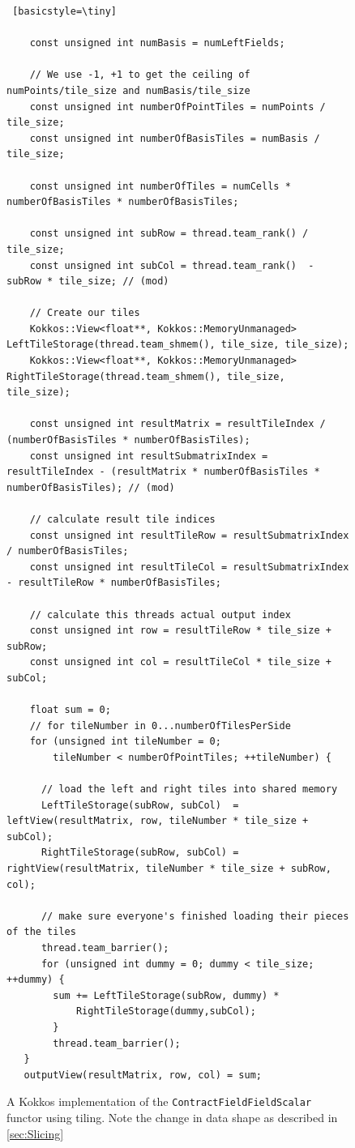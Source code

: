 \begin{figure}[H]
    \begin{lstlisting} [basicstyle=\tiny]
    
    const unsigned int numBasis = numLeftFields;

    // We use -1, +1 to get the ceiling of numPoints/tile_size and numBasis/tile_size
    const unsigned int numberOfPointTiles = numPoints / tile_size;
    const unsigned int numberOfBasisTiles = numBasis / tile_size;

    const unsigned int numberOfTiles = numCells * numberOfBasisTiles * numberOfBasisTiles;

    const unsigned int subRow = thread.team_rank() / tile_size;
    const unsigned int subCol = thread.team_rank()  - subRow * tile_size; // (mod)

    // Create our tiles
    Kokkos::View<float**, Kokkos::MemoryUnmanaged> LeftTileStorage(thread.team_shmem(), tile_size, tile_size);
    Kokkos::View<float**, Kokkos::MemoryUnmanaged> RightTileStorage(thread.team_shmem(), tile_size, tile_size);

    const unsigned int resultMatrix = resultTileIndex / (numberOfBasisTiles * numberOfBasisTiles);
    const unsigned int resultSubmatrixIndex = resultTileIndex - (resultMatrix * numberOfBasisTiles * numberOfBasisTiles); // (mod)

    // calculate result tile indices
    const unsigned int resultTileRow = resultSubmatrixIndex / numberOfBasisTiles;
    const unsigned int resultTileCol = resultSubmatrixIndex  - resultTileRow * numberOfBasisTiles;

    // calculate this threads actual output index
    const unsigned int row = resultTileRow * tile_size + subRow;
    const unsigned int col = resultTileCol * tile_size + subCol;

    float sum = 0;
    // for tileNumber in 0...numberOfTilesPerSide
    for (unsigned int tileNumber = 0;
        tileNumber < numberOfPointTiles; ++tileNumber) {

      // load the left and right tiles into shared memory
      LeftTileStorage(subRow, subCol)  = leftView(resultMatrix, row, tileNumber * tile_size + subCol);
      RightTileStorage(subRow, subCol) = rightView(resultMatrix, tileNumber * tile_size + subRow, col);
      
      // make sure everyone's finished loading their pieces of the tiles
      thread.team_barrier();
      for (unsigned int dummy = 0; dummy < tile_size; ++dummy) {
        sum += LeftTileStorage(subRow, dummy) *
            RightTileStorage(dummy,subCol);
        }
        thread.team_barrier();
   }
   outputView(resultMatrix, row, col) = sum;
 \end{lstlisting}
 \caption[\texttt{ContractFieldFieldScalar} tiling implementation]{A
     Kokkos implementation
     of the \texttt{ContractFieldFieldScalar} functor using tiling. Note the change 
     in data shape as described in \ref{sec:Slicing}}
 \label{lst:ContractFieldFieldScalarTilingCode}
\end{figure}


